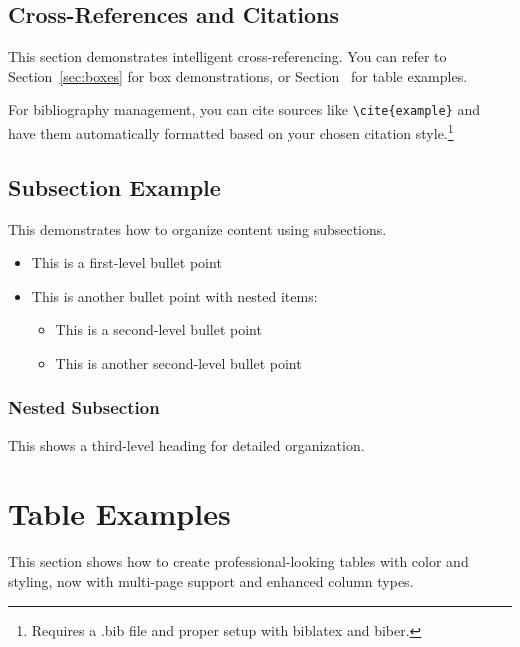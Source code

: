 \documentclass[a4paper,11pt]{article}
\begin{document}
\subsection{Cross-References and Citations}

This section demonstrates intelligent cross-referencing. You can refer to Section~\ref{sec:boxes} for box demonstrations, or Section~ for table examples.

For bibliography management, you can cite sources like \texttt{\textbackslash cite\{example\}} and have them automatically formatted based on your chosen citation style.\footnote{Requires a .bib file and proper setup with biblatex and biber.}

\subsection{Subsection Example}

This demonstrates how to organize content using subsections.

\begin{itemize}
    \item This is a first-level bullet point
    \item This is another bullet point with nested items:
    \begin{itemize}
        \item This is a second-level bullet point
        \item This is another second-level bullet point
    \end{itemize}
\end{itemize}

\subsubsection{Nested Subsection}

This shows a third-level heading for detailed organization.

\section{Table Examples}
\label{sec:tables}

This section shows how to create professional-looking tables with color and styling, now with multi-page support and enhanced column types.
\end{document}
